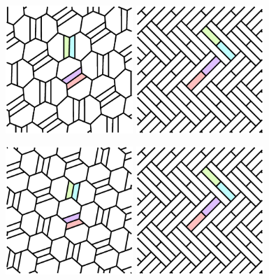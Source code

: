 \documentclass{beamer}
\begin{document}
\begin{frame}
  \begin{center}
    \includegraphics[width=1.9in]{c05}
    \includegraphics[width=1.9in]{c12}
  \end{center}
\end{frame}

\begin{frame}
  \begin{center}
    \includegraphics[width=1.9in]{c06}
    \includegraphics[width=1.9in]{c12}
  \end{center}
\end{frame}
\end{document}
